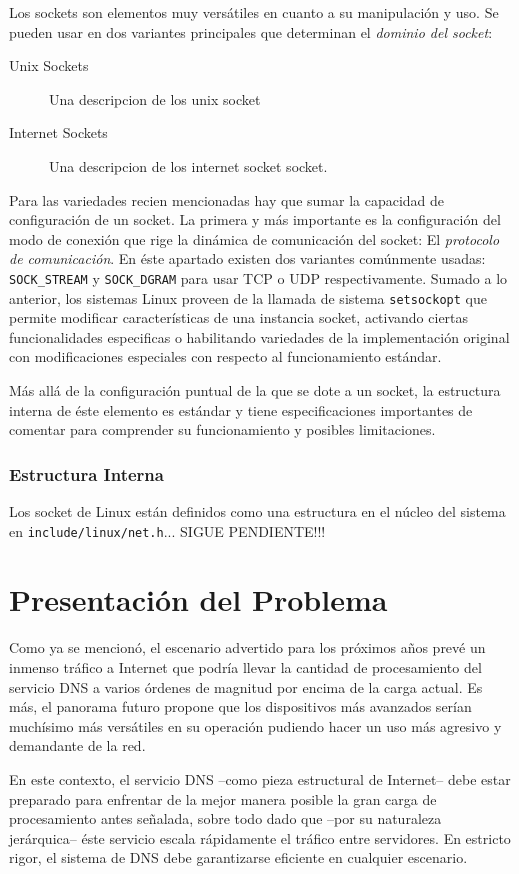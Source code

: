 Los sockets son elementos muy versátiles en cuanto a su manipulación y uso. Se pueden usar en dos variantes principales que determinan el \emph{dominio del socket}:
\begin{description}
\item[Unix Sockets] Una descripcion de los unix socket
\item[Internet Sockets] Una descripcion de los internet socket socket.
\end{description}

Para las variedades recien mencionadas hay que sumar la capacidad de configuración de un socket. La primera y más importante es la configuración del modo de conexión que rige la dinámica de comunicación del socket: El \emph{protocolo de comunicación}. En éste apartado existen dos variantes comúnmente usadas: \verb=SOCK_STREAM= y \verb=SOCK_DGRAM= para usar TCP o UDP respectivamente. Sumado a lo anterior, los sistemas Linux proveen de la llamada de sistema \verb=setsockopt= que permite modificar características de una instancia socket, activando ciertas funcionalidades especificas o habilitando variedades de la implementación original con modificaciones especiales con respecto al funcionamiento estándar.

Más allá de la configuración puntual de la que se dote a un socket, la estructura interna de éste elemento es estándar y tiene especificaciones importantes de comentar para comprender su funcionamiento y posibles limitaciones.

\subsubsection{Estructura Interna}
Los socket de Linux están definidos como una estructura en el núcleo del sistema en \verb=include/linux/net.h=... SIGUE PENDIENTE!!!

\section{Presentación del Problema}
Como ya se mencionó, el escenario advertido para los próximos años prevé un inmenso tráfico a Internet que podría llevar la cantidad de procesamiento del servicio DNS a varios órdenes de magnitud por encima de la carga actual. Es más, el panorama futuro propone que los dispositivos más avanzados serían muchísimo más versátiles en su operación pudiendo hacer un uso más agresivo y demandante de la red. 

En este contexto, el servicio DNS --como pieza estructural de Internet-- debe estar preparado para enfrentar de la mejor manera posible la gran carga de procesamiento antes señalada, sobre todo dado que --por su naturaleza jerárquica-- éste servicio escala rápidamente el tráfico entre servidores. En estricto rigor, el sistema de DNS debe garantizarse eficiente en cualquier escenario.

